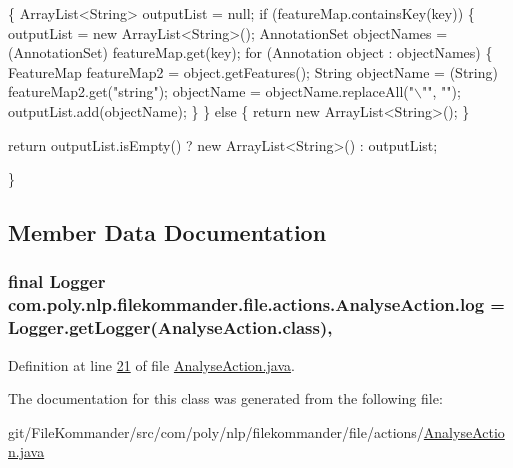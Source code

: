 \begin{DoxyCode}
                                               \{
        ArrayList<String> outputList = null;
        \textcolor{keywordflow}{if} (featureMap.containsKey(key)) \{
            outputList = \textcolor{keyword}{new} ArrayList<String>();
            AnnotationSet objectNames = (AnnotationSet) featureMap.get(key);
            \textcolor{keywordflow}{for} (Annotation \textcolor{keywordtype}{object} : objectNames) \{
                FeatureMap featureMap2 = \textcolor{keywordtype}{object}.getFeatures();
                String objectName = (String) featureMap2.get(\textcolor{stringliteral}{"string"});
                objectName = objectName.replaceAll(\textcolor{stringliteral}{"\(\backslash\)""}, \textcolor{stringliteral}{""});
                outputList.add(objectName);
            \}
        \} \textcolor{keywordflow}{else} \{
            \textcolor{keywordflow}{return} \textcolor{keyword}{new} ArrayList<String>();
        \}

        \textcolor{keywordflow}{return} outputList.isEmpty() ? \textcolor{keyword}{new} ArrayList<String>() : outputList;

    \}
\end{DoxyCode}


\subsection{Member Data Documentation}
\hypertarget{classcom_1_1poly_1_1nlp_1_1filekommander_1_1file_1_1actions_1_1_analyse_action_ae99df52b353dd7b0d2014d581fcc8cff}{
\subsubsection[{log}]{\setlength{\rightskip}{0pt plus 5cm}final Logger com.\-poly.\-nlp.\-filekommander.\-file.\-actions.\-Analyse\-Action.\-log = Logger.\-get\-Logger(Analyse\-Action.\-class)\hspace{0.3cm}{\ttfamily [static]}, {\ttfamily [private]}}}\label{classcom_1_1poly_1_1nlp_1_1filekommander_1_1file_1_1actions_1_1_analyse_action_ae99df52b353dd7b0d2014d581fcc8cff}


Definition at line \hyperlink{L21}{21} of file \hyperlink{}{Analyse\-Action.\-java}.



The documentation for this class was generated from the following file\-:\begin{DoxyCompactItemize}
\item 
git/\-File\-Kommander/src/com/poly/nlp/filekommander/file/actions/\hyperlink{_analyse_action_8java}{Analyse\-Action.\-java}\end{DoxyCompactItemize}
